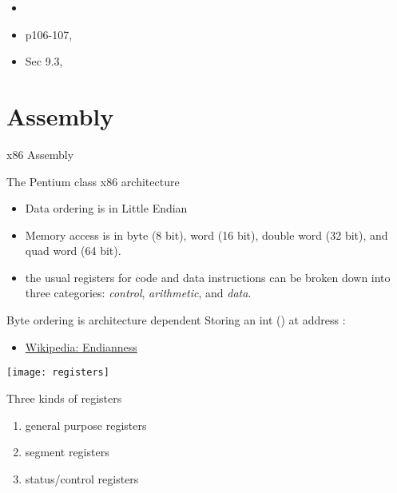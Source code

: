 \begin{itemize}
\item {}  
\item p106-107, \cite{love2010linux}
\item Sec 9.3, \cite{bovet2005understanding}
\end{itemize}

\section{Assembly}
\label{sec:assembly}

\begin{frame}{x86 Assembly}
  \begin{block}{The Pentium class x86 architecture}
    \begin{itemize}
    \item Data ordering is in Little Endian
    \item Memory access is in byte (8 bit), word (16 bit), double word (32 bit), and quad
      word (64 bit).
    \item the usual registers for code and data instructions can be broken down into three
      categories: \emph{control}, \emph{arithmetic}, and \emph{data}.
    \end{itemize}
  \end{block}
\end{frame}

\begin{frame}
  \begin{block}{Byte ordering is architecture dependent}
    Storing an int () at address :
    \begin{center}
       
    \end{center}
  \end{block}
\end{frame}

\begin{itemize}
\item \href{http://en.wikipedia.org/wiki/Endianness}{Wikipedia: Endianness}
\end{itemize}

\begin{frame}
  \begin{center}
    \texttt{[image: registers]}
  \end{center}
  \begin{block}{Three kinds of registers}
    \begin{enumerate}
    \item general purpose registers
    \item segment registers
    \item status/control registers
    \end{enumerate}
  \end{block}
\end{frame}

